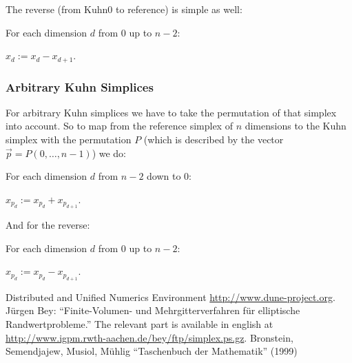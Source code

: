 \documentclass[english,a4paper]{article}
\begin{document}
The reverse (from Kuhn0 to reference) is simple as well:
\begin{compactitem}
\item For each dimension $d$ from 0 up to $n-2$:
  \begin{compactitem}
  \item $x_d:=x_d-x_{d+1}$.
  \end{compactitem}
\end{compactitem}

\subsubsection{Arbitrary Kuhn Simplices}

For arbitrary Kuhn simplices we have to take the permutation of that
simplex into account.  So to map from the reference simplex of $n$
dimensions to the Kuhn simplex with the permutation $P$ (which is
described by the vector $\vec{p}=P(0,\ldots,n-1)$) we do:
\begin{compactitem}
\item For each dimension $d$ from $n-2$ down to 0:
  \begin{compactitem}
  \item $x_{p_d}:=x_{p_d}+x_{p_{d+1}}$.
  \end{compactitem}
\end{compactitem}\vspace{2ex}

And for the reverse:
\begin{compactitem}
\item For each dimension $d$ from 0 up to $n-2$:
  \begin{compactitem}
  \item $x_{p_d}:=x_{p_d}-x_{p_{d+1}}$.
  \end{compactitem}
\end{compactitem}

\begin{thebibliography}{0}
 Distributed and Unified Numerics Environment
  \url{http://www.dune-project.org}.
 J\"urgen Bey: ``Finite-Volumen-
    und Mehrgitterverfahren f\"ur elliptische Randwertprobleme.''  The
  relevant part is available in english at
  \url{http://www.igpm.rwth-aachen.de/bey/ftp/simplex.ps.gz}.
 Bronstein, Semendjajew, Musiol, M\"uhlig
  ``Taschenbuch der Mathematik'' (1999)
\end{thebibliography}
\end{document}

